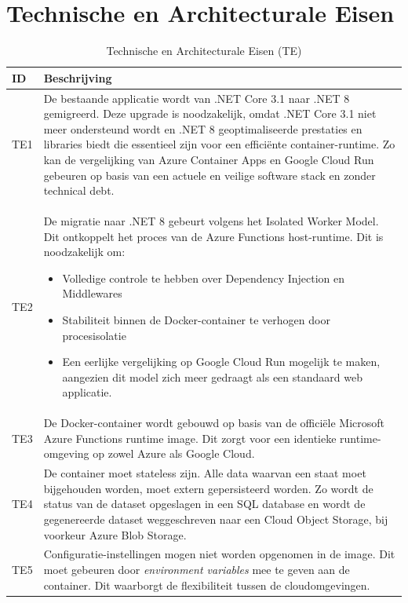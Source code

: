 \section{Technische en Architecturale Eisen}
\begin{table}[H]
    \centering
    \caption{Technische en Architecturale Eisen (TE)}
    \label{tab:technische_eisen}
    \begin{tabular}{|l|p{15cm}|}
        \hline
        \textbf{ID} & \textbf{Beschrijving} \\ \hline
        TE1 & De bestaande applicatie wordt van .NET Core 3.1 naar .NET 8 gemigreerd. Deze upgrade is noodzakelijk, omdat .NET Core 3.1 niet meer ondersteund wordt en .NET 8 geoptimaliseerde prestaties en libraries biedt die essentieel zijn voor een efficiënte container-runtime. Zo kan de vergelijking van Azure Container Apps en Google Cloud Run gebeuren op basis van een actuele en veilige software stack en zonder technical debt. \\ \hline
        TE2 & De migratie naar .NET 8 gebeurt volgens het Isolated Worker Model. Dit ontkoppelt het proces van de Azure Functions host-runtime. Dit is noodzakelijk om:
        \begin{itemize}[nosep, leftmargin=*]
            \item Volledige controle te hebben over Dependency Injection en Middlewares
            \item Stabiliteit binnen de Docker-container te verhogen door procesisolatie
            \item Een eerlijke vergelijking op Google Cloud Run mogelijk te maken, aangezien dit model zich meer gedraagt als een standaard web applicatie.
        \end{itemize} \\ \hline
        TE3 & De Docker-container wordt gebouwd op basis van de officiële Microsoft Azure Functions runtime image. Dit zorgt voor een identieke runtime-omgeving op zowel Azure als Google Cloud. \\ \hline
        TE4 & De container moet stateless zijn. Alle data waarvan een staat moet bijgehouden worden, moet extern gepersisteerd worden. Zo wordt de status van de dataset opgeslagen in een SQL database en wordt de gegenereerde dataset weggeschreven naar een Cloud Object Storage, bij voorkeur Azure Blob Storage. \\ \hline
        TE5 & Configuratie-instellingen mogen niet worden opgenomen in de image. Dit moet gebeuren door \textit{environment variables} mee te geven aan de container. Dit waarborgt de flexibiliteit tussen de cloudomgevingen. \\ \hline

\end{tabular}
\end{table}
